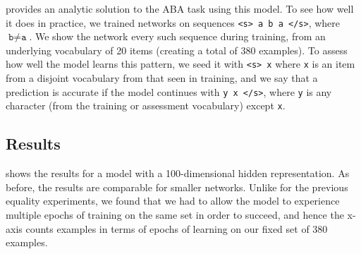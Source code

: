 \documentclass[9pt,twocolumn,twoside,lineno]{pnas-new}
\begin{document}
 provides an analytic solution to the ABA task using this model.  To see how well it does in practice, we trained networks on sequences \texttt{<s> a b a </s>}, where $\texttt{b} \neq \texttt{a}$. We show the network every such sequence during training, from an underlying vocabulary of 20 items (creating a total of 380 examples). To assess how well the model learns this pattern, we seed it with \texttt{<s> x} where \texttt{x} is an item from a disjoint vocabulary from that seen in training, and we say that a prediction is accurate if the model continues with \texttt{y x </s>}, where \texttt{y} is any character (from the training or assessment vocabulary) except \texttt{x}.


\subsection*{Results}

 shows the results for a model with a 100-dimensional hidden representation. As before, the results are comparable for smaller networks. Unlike for the previous equality experiments, we found that we had to allow the model to experience multiple epochs of training on the same set in order to succeed, and hence the x-axis counts examples in terms of epochs of learning on our fixed set of 380 examples.
\end{document}
